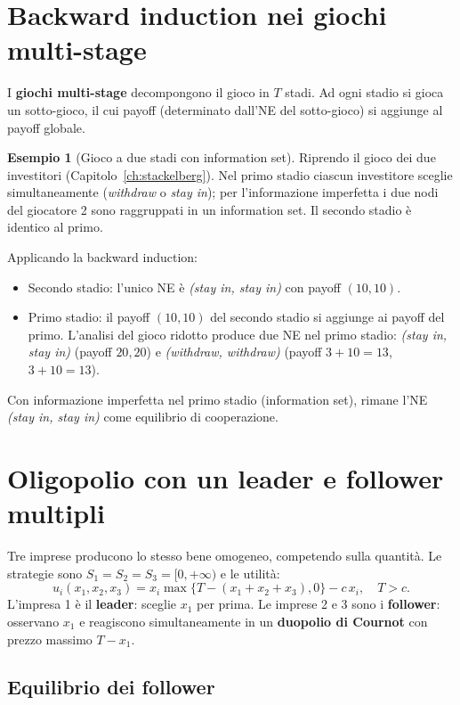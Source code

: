 \documentclass[12pt,a4paper,twoside]{book}
\theoremstyle{plain}
\theoremstyle{definition}
\newtheorem{example}[theorem]{Esempio}
\begin{document}
\section{Backward induction nei giochi multi-stage}

I \textbf{giochi multi-stage} decompongono il gioco in $T$ stadi. Ad ogni stadio si gioca un sotto-gioco, il cui payoff (determinato dall'NE del sotto-gioco) si aggiunge al payoff globale.

\begin{example}[Gioco a due stadi con information set]
Riprendo il gioco dei due investitori (Capitolo~\ref{ch:stackelberg}). Nel primo stadio ciascun investitore sceglie simultaneamente (\emph{withdraw} o \emph{stay in}); per l'informazione imperfetta i due nodi del giocatore 2 sono raggruppati in un information set. Il secondo stadio è identico al primo.

Applicando la backward induction:
\begin{itemize}
  \item Secondo stadio: l'unico NE è \emph{(stay in, stay in)} con payoff $(10,10)$.
  \item Primo stadio: il payoff $(10,10)$ del secondo stadio si aggiunge ai payoff del primo. L'analisi del gioco ridotto produce due NE nel primo stadio: \emph{(stay in, stay in)} (payoff $20,20$) e \emph{(withdraw, withdraw)} (payoff $3+10=13$, $3+10=13$).
\end{itemize}
Con informazione imperfetta nel primo stadio (information set), rimane l'NE \emph{(stay in, stay in)} come equilibrio di cooperazione.
\end{example}

\section{Oligopolio con un leader e follower multipli}

Tre imprese producono lo stesso bene omogeneo, competendo sulla quantità. Le strategie sono $S_1=S_2=S_3=[0,+\infty)$ e le utilità:
\[
  u_i(x_1,x_2,x_3) = x_i\max\{T-(x_1+x_2+x_3),0\} - c\,x_i,\quad T>c.
\]
L'impresa 1 è il \textbf{leader}: sceglie $x_1$ per prima. Le imprese 2 e 3 sono i \textbf{follower}: osservano $x_1$ e reagiscono simultaneamente in un \textbf{duopolio di Cournot} con prezzo massimo $T-x_1$.

\subsection{Equilibrio dei follower}
\end{document}
